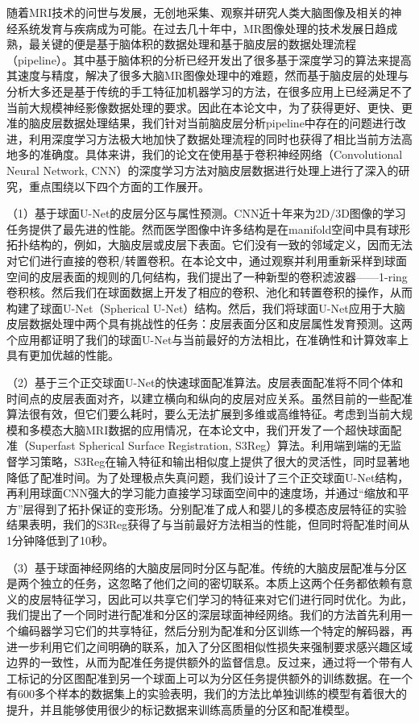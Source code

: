 \cleardoublepage
{}
随着MRI技术的问世与发展，无创地采集、观察并研究人类大脑图像及相关的神经系统发育与疾病成为可能。在过去几十年中，MR图像处理的技术发展日趋成熟，最关键的便是基于脑体积的数据处理和基于脑皮层的数据处理流程（pipeline）。其中基于脑体积的分析已经开发出了很多基于深度学习的算法来提高其速度与精度，解决了很多大脑MR图像处理中的难题，然而基于脑皮层的处理与分析大多还是基于传统的手工特征加机器学习的方法，在很多应用上已经满足不了当前大规模神经影像数据处理的要求。因此在本论文中，为了获得更好、更快、更准的脑皮层数据处理结果，我们针对当前脑皮层分析pipeline中存在的问题进行改进，利用深度学习方法极大地加快了数据处理流程的同时也获得了相比当前方法高地多的准确度。具体来讲，我们的论文在使用基于卷积神经网络（Convolutional Neural Network, CNN）的深度学习方法对脑皮层数据进行处理上进行了深入的研究，重点围绕以下四个方面的工作展开。

（1）基于球面U-Net的皮层分区与属性预测。CNN近十年来为2D/3D图像的学习任务提供了最先进的性能。然而医学图像中许多结构是在manifold空间中具有球形拓扑结构的，例如，大脑皮层或皮层下表面。它们没有一致的邻域定义，因而无法对它们进行直接的卷积/转置卷积。在本论文中，通过观察并利用重新采样到球面空间的皮层表面的规则的几何结构，我们提出了一种新型的卷积滤波器——1-ring卷积核。然后我们在球面数据上开发了相应的卷积、池化和转置卷积的操作，从而构建了球面U-Net（Spherical U-Net）结构。然后，我们将球面U-Net应用于大脑皮层数据处理中两个具有挑战性的任务：皮层表面分区和皮层属性发育预测。这两个应用都证明了我们的球面U-Net与当前最好的方法相比，在准确性和计算效率上具有更加优越的性能。

（2）基于三个正交球面U-Net的快速球面配准算法。皮层表面配准将不同个体和时间点的皮层表面对齐，以建立横向和纵向的皮层对应关系。虽然目前的一些配准算法很有效，但它们要么耗时，要么无法扩展到多维或高维特征。考虑到当前大规模和多模态大脑MRI数据的应用情况，在本论文中，我们开发了一个超快球面配准（Superfast Spherical Surface Registration, S3Reg）算法。利用端到端的无监督学习策略，S3Reg在输入特征和输出相似度上提供了很大的灵活性，同时显著地降低了配准时间。为了处理极点失真问题，我们设计了三个正交球面U-Net结构，再利用球面CNN强大的学习能力直接学习球面空间中的速度场，并通过“缩放和平方”层得到了拓扑保证的变形场。分别配准了成人和婴儿的多模态皮层特征的实验结果表明，我们的S3Reg获得了与当前最好方法相当的性能，但同时将配准时间从1分钟降低到了10秒。	

（3）基于球面神经网络的大脑皮层同时分区与配准。传统的大脑皮层配准与分区是两个独立的任务，这忽略了他们之间的密切联系。本质上这两个任务都依赖有意义的皮层特征学习，因此可以共享它们学习的特征来对它们进行同时优化。为此，我们提出了一个同时进行配准和分区的深层球面神经网络。我们的方法首先利用一个编码器学习它们的共享特征，然后分别为配准和分区训练一个特定的解码器，再进一步利用它们之间明确的联系，加入了分区图相似性损失来强制要求感兴趣区域边界的一致性，从而为配准任务提供额外的监督信息。反过来，通过将一个带有人工标记的分区图配准到另一个球面上可以为分区任务提供额外的训练数据。在一个有600多个样本的数据集上的实验表明，我们的方法比单独训练的模型有着很大的提升，并且能够使用很少的标记数据来训练高质量的分区和配准模型。

